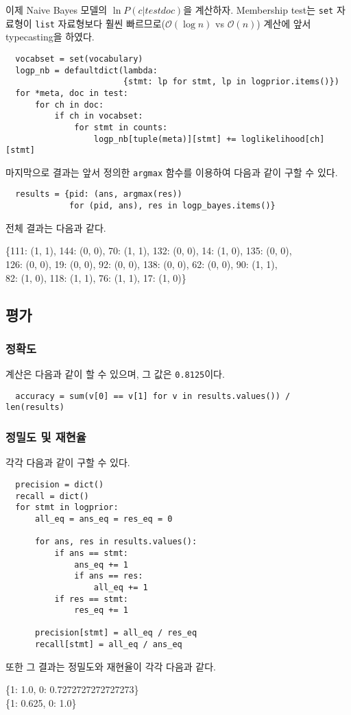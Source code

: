 \documentclass[a4paper,11pt]{scrartcl}
\begin{document}
\pagebreak
이제 Naive Bayes 모델의 \(\ln{} P(c|testdoc)\)을 계산하자. Membership test는 \lstinline{set} 자료형이 \lstinline{list} 자료형보다 훨씬 빠르므로(\(\mathcal{O}(\log{}n)\) vs \(\mathcal{O}(n)\)) 계산에 앞서 typecasting을 하였다.
\begin{lstlisting}
  vocabset = set(vocabulary)
  logp_nb = defaultdict(lambda:
                        {stmt: lp for stmt, lp in logprior.items()})
  for *meta, doc in test:
      for ch in doc:
          if ch in vocabset:
              for stmt in counts:
                  logp_nb[tuple(meta)][stmt] += loglikelihood[ch][stmt]
\end{lstlisting}

마지막으로 결과는 앞서 정의한 \lstinline{argmax} 함수를 이용하여 다음과 같이 구할 수 있다.
\begin{lstlisting}
  results = {pid: (ans, argmax(res))
             for (pid, ans), res in logp_bayes.items()}
\end{lstlisting}

전체 결과는 다음과 같다.

\par\medskip
\begin{longfbox}[margin-left=1em]
  \ttfamily
  \noindent \{111: (1, 1), 144: (0, 0), 70: (1, 1), 132: (0, 0), 14: (1, 0), 135: (0, 0), \\
  \phantom{\{}126: (0, 0), 19: (0, 0), 92: (0, 0), 138: (0, 0), 62: (0, 0), 90: (1, 1), \\
  \phantom{\{}82: (1, 0), 118: (1, 1), 76: (1, 1), 17: (1, 0)\}
\end{longfbox}

\subsection{평가}
\subsubsection{정확도}
계산은 다음과 같이 할 수 있으며, 그 값은 \lstinline{0.8125}이다.
\begin{lstlisting}
  accuracy = sum(v[0] == v[1] for v in results.values()) / len(results)
\end{lstlisting}

\subsubsection{정밀도 및 재현율}
각각 다음과 같이 구할 수 있다.

\pagebreak
\begin{lstlisting}
  precision = dict()
  recall = dict()
  for stmt in logprior:
      all_eq = ans_eq = res_eq = 0

      for ans, res in results.values():
          if ans == stmt:
              ans_eq += 1
              if ans == res:
                  all_eq += 1
          if res == stmt:
              res_eq += 1

      precision[stmt] = all_eq / res_eq
      recall[stmt] = all_eq / ans_eq
\end{lstlisting}

또한 그 결과는 정밀도와 재현율이 각각 다음과 같다.
\par\medskip
\begin{longfbox}[margin-left=1em]
  \ttfamily
  \noindent \{1: 1.0, 0: 0.7272727272727273\} \\
  \{1: 0.625, 0: 1.0\}
\end{longfbox}
\end{document}
